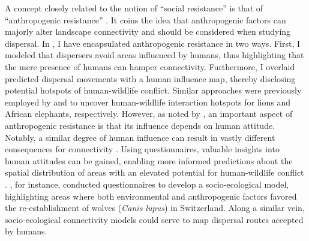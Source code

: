 \documentclass[../FinalThesis.tex]{subfiles}
\begin{document}
A concept closely related to the notion of ``social resistance'' is that of
``anthropogenic resistance'' \citep{Ghoddousi.2021}. It coins the idea that
anthropogenic factors can majorly alter landscape connectivity and should be
considered when studying dispersal. In , I have encapsulated
anthropogenic resistance in two ways. First, I modeled that dispersers avoid
areas influenced by humans, thus highlighting that the mere presence of humans
can hamper connectivity. Furthermore, I overlaid predicted dispersal movements
with a human influence map, thereby disclosing potential hotspots of
human-wildlife conflict. Similar approaches were previously employed by
\citet{Cushman.2018} and \citet{Buchholtz.2020} to uncover human-wildlife
interaction hotspots for lions and African elephants, respectively. However, as
noted by \citet{Ghoddousi.2021}, an important aspect of anthropogenic resistance
is that its influence depends on human attitude. Notably, a similar degree of
human influence can result in vastly different consequences for connectivity
\citep{Ghoddousi.2021}. Using questionnaires, valuable insights into human
attitudes can be gained, enabling more informed predictions about the spatial
distribution of areas with an elevated potential for human-wildlife conflict
\citep{Feldmeier.2024}. \citet{Behr.2017}, for instance, conducted
questionnaires to develop a socio-ecological model, highlighting areas where
both environmental and anthropogenic factors favored the re-establishment of
wolves (\textit{Canis lupus}) in Switzerland. Along a similar vein,
socio-ecological connectivity models could serve to map dispersal routes
accepted by humans.
\end{document}
